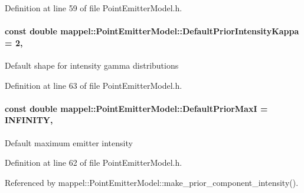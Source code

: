 Definition at line 59 of file Point\+Emitter\+Model.\+h.

\paragraph[{\texorpdfstring{Default\+Prior\+Intensity\+Kappa}{DefaultPriorIntensityKappa}}]{\setlength{\rightskip}{0pt plus 5cm}const double mappel\+::\+Point\+Emitter\+Model\+::\+Default\+Prior\+Intensity\+Kappa = 2\hspace{0.3cm}{\ttfamily [static]}, {\ttfamily [inherited]}}\hypertarget{classmappel_1_1PointEmitterModel_a03d9f90c130df2d42d0d31c9337e914c}{}\label{classmappel_1_1PointEmitterModel_a03d9f90c130df2d42d0d31c9337e914c}
Default shape for intensity gamma distributions 

Definition at line 63 of file Point\+Emitter\+Model.\+h.

\paragraph[{\texorpdfstring{Default\+Prior\+MaxI}{DefaultPriorMaxI}}]{\setlength{\rightskip}{0pt plus 5cm}const double mappel\+::\+Point\+Emitter\+Model\+::\+Default\+Prior\+MaxI = I\+N\+F\+I\+N\+I\+TY\hspace{0.3cm}{\ttfamily [static]}, {\ttfamily [inherited]}}\hypertarget{classmappel_1_1PointEmitterModel_a4ad3422744bdac162e905d5615bf5b66}{}\label{classmappel_1_1PointEmitterModel_a4ad3422744bdac162e905d5615bf5b66}
Default maximum emitter intensity 

Definition at line 62 of file Point\+Emitter\+Model.\+h.



Referenced by mappel\+::\+Point\+Emitter\+Model\+::make\+\_\+prior\+\_\+component\+\_\+intensity().

